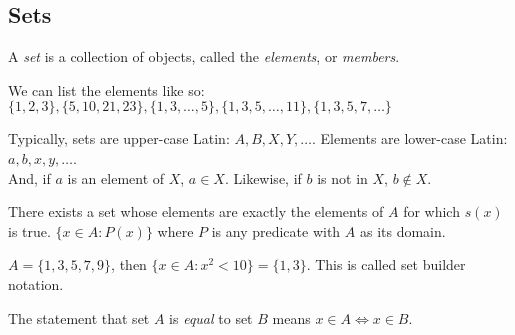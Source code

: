 \documentclass{article}
\def \subheaderSpace {10pt}
\begin{document}
\newpage

    \subsection{Sets}

        \begin{definition}
            A \textit{set} is a collection of objects, called the \textit{elements}, or \textit{members}.
        \end{definition}

        \vspace{\subheaderSpace}

        We can list the elements like so: \\
        $\{1,2,3\}, \{5,10,21,23\}, \{1,3,\dots,5\}, \{1,3,5,\dots,11\}, \{1,3,5,7,\dots\}$
        
        \vspace{\subheaderSpace}

        \begin{terminology}
            Typically, sets are upper-case Latin: $A, B, X, Y, \dots$.
            Elements are lower-case Latin: $a,b,x,y,\dots$. \\
            And, if $a$ is an element of $X$, $a\in X$. Likewise, if $b$ is not in $X$, $b\notin X$.
        \end{terminology}

        \vspace{\subheaderSpace}

        \begin{definition}            
            There exists a set whose elements are exactly the elements of $A$ for which $s(x)$ is true.
            $\{x\in A\colon P(x)\}$ where $P$ is any predicate with $A$ as its domain. 
        \end{definition}

        \vspace{\subheaderSpace}

        \begin{example}
            $A = \{1,3,5,7,9\}$, then $\{x\in A\colon x^2 < 10\} = \{1,3\}$. This is called set builder notation. 
        \end{example}

        \vspace{\subheaderSpace}

        \begin{definition}
            The statement that set $A$ is \textit{equal} to set $B$ means $x\in A \iff x\in B$.
        \end{definition}
\end{document}
